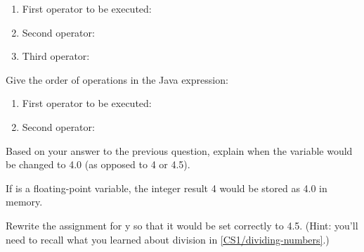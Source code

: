 \begin{enumerate}
\item First operator to be executed: \ans{\java{-}}
\item Second operator: \ans{\java{*}}
\item Third operator: \ans{\java{=}}
\end{enumerate}


\Q Give the order of operations in the Java expression: ~ 

\begin{enumerate}
\item First operator to be executed: \ans{\java{/}}
\item Second operator: \ans{\java{=}}
\end{enumerate}


\Q Based on your answer to the previous question, explain when the variable  would be changed to 4.0 (as opposed to 4 or 4.5).

\begin{answer}
If  is a floating-point variable, the integer result 4 would be stored as 4.0 in memory.
\end{answer}


\Q Rewrite the assignment for y so that it would be set correctly to 4.5. (Hint: you'll need to recall what you learned about division in \ref{CS1/dividing-numbers}.)

\begin{answer}
\end{answer}
